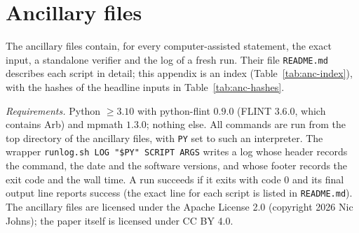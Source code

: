 \section{Ancillary files}\label{app:anc}

The ancillary files contain, for every computer-assisted statement, the exact input, a standalone verifier and the
log of a fresh run. Their file \nolinkurl{README.md} describes each script in detail; this appendix is an index
(Table~\ref{tab:anc-index}), with the hashes of the headline inputs in Table~\ref{tab:anc-hashes}.

\emph{Requirements.} Python $\ge3.10$ with python-flint $0.9.0$ (FLINT $3.6.0$, which contains Arb) and mpmath $1.3.0$;
nothing else. All commands are run from the top directory of the ancillary files, with \texttt{PY} set to such an
interpreter. The wrapper \texttt{runlog.sh LOG "\$PY" SCRIPT ARGS} writes a log whose header records the command, the date
and the software versions, and whose footer records the exit code and the wall time. A run succeeds if it exits with
code $0$ and its final output line reports success (the exact line for each script is listed in \nolinkurl{README.md}).
The ancillary files are licensed under the Apache License 2.0 (copyright 2026 Nic Johns); the paper itself is licensed under
CC BY 4.0.


